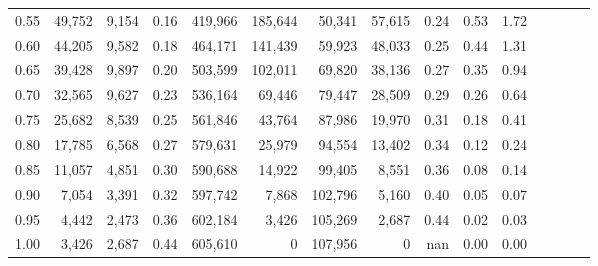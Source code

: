 \begin{tabular}{rrrcrrrrrrrrrrr}
0.55 &  49,752 &  9,154 &                                       0.16 &  419,966 &  185,644 &   50,341 &   57,615 &  0.24 &  0.53 &                         1.72 \\
0.60 &  44,205 &  9,582 &                                       0.18 &  464,171 &  141,439 &   59,923 &   48,033 &  0.25 &  0.44 &                         1.31 \\
0.65 &  39,428 &  9,897 &                                       0.20 &  503,599 &  102,011 &   69,820 &   38,136 &  0.27 &  0.35 &                         0.94 \\
0.70 &  32,565 &  9,627 &                                       0.23 &  536,164 &   69,446 &   79,447 &   28,509 &  0.29 &  0.26 &                         0.64 \\
0.75 &  25,682 &  8,539 &                                       0.25 &  561,846 &   43,764 &   87,986 &   19,970 &  0.31 &  0.18 &                         0.41 \\
0.80 &  17,785 &  6,568 &                                       0.27 &  579,631 &   25,979 &   94,554 &   13,402 &  0.34 &  0.12 &                         0.24 \\
0.85 &  11,057 &  4,851 &                                       0.30 &  590,688 &   14,922 &   99,405 &    8,551 &  0.36 &  0.08 &                         0.14 \\
0.90 &   7,054 &  3,391 &                                       0.32 &  597,742 &    7,868 &  102,796 &    5,160 &  0.40 &  0.05 &                         0.07 \\
0.95 &   4,442 &  2,473 &                                       0.36 &  602,184 &    3,426 &  105,269 &    2,687 &  0.44 &  0.02 &                         0.03 \\
1.00 &   3,426 &  2,687 &                                       0.44 &  605,610 &        0 &  107,956 &        0 &   nan &  0.00 &                         0.00 \\
\bottomrule
\end{tabular}
